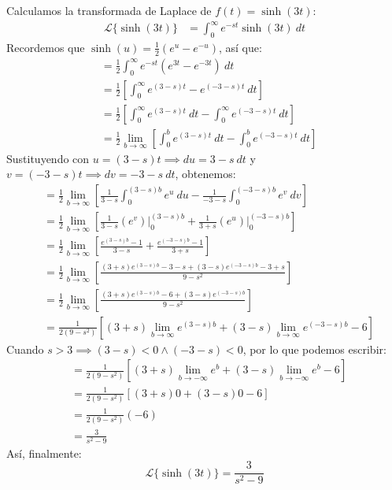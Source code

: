 \documentclass[12pt, a4paper]{article}
\begin{document}
Calculamos la transformada de Laplace de \(f(t) = \sinh(3t)\):
\begin{align*}
	\mathcal{L}\{\sinh(3t)\} &= \int_{0}^{\infty} e^{-st} \sinh(3t) \ dt
\end{align*}
Recordemos que \(\sinh(u) = \frac{1}{2} (e^{u} - e^{-u})\), así que:
\begin{align*}
	&= \frac{1}{2} \int_{0}^{\infty} e^{-st} (e^{3t} - e^{-3t}) \ dt \\
	&= \frac{1}{2} \left[ \int_{0}^{\infty} e^{(3-s)t} - e^{(-3-s)t} \ dt \right] \\
	&= \frac{1}{2} \left[ \int_{0}^{\infty} e^{(3-s)t} \ dt - \int_{0}^{\infty} e^{(-3-s)t} \ dt \right] \\
	&= \frac{1}{2} \lim_{b \to \infty} \left[ \int_{0}^{b} e^{(3-s)t} \ dt - \int_{0}^{b} e^{(-3-s)t} \ dt \right]
\end{align*}
Sustituyendo con \(u = (3-s)t \implies du = 3-s\ dt\) y \(v = (-3-s)t \implies dv = -3-s\ dt\), obtenemos:
\begin{align*}
	&= \frac{1}{2} \lim_{b \to \infty} \left[ \frac{1}{3-s} \int_{0}^{(3-s)b} e^{u} \ du - \frac{1}{-3-s} \int_{0}^{(-3-s)b} e^{v} \ dv \right] \\
	&= \frac{1}{2} \lim_{b \to \infty} \left[ \frac{1}{3-s} \left. \left( e^{v} \right) \right|_{0}^{(3-s)b} + \frac{1}{3+s} \left. \left( e^{u} \right) \right|_{0}^{(-3-s)b} \right] \\
	&= \frac{1}{2} \lim_{b \to \infty} \left[ \frac{e^{(3-s)b} - 1}{3-s} + \frac{e^{(-3-s)b} - 1}{3+s} \right] \\
	&= \frac{1}{2} \lim_{b \to \infty} \left[ \frac{(3+s) e^{(3-s)b} - 3 - s + (3-s)e^{(-3-s)b} - 3 + s}{9-s ^{2}} \right] \\
	&= \frac{1}{2} \lim_{b \to \infty} \left[ \frac{(3+s) e^{(3-s)b} - 6 + (3-s)e^{(-3-s)b}}{9-s ^{2}} \right] \\
	&= \frac{1}{2(9-s ^{2})} \left[ (3+s) \lim_{b \to \infty} e^{(3-s)b} + (3-s) \lim_{b \to \infty} e^{(-3-s)b} - 6 \right]
\end{align*}
Cuando \(s > 3 \implies (3-s) < 0 \land (-3-s) < 0\), por lo que podemos escribir:
\begin{align*}
	&= \frac{1}{2(9-s ^{2})} \left[ (3+s) \lim_{b \to -\infty} e^{b} + (3-s) \lim_{b \to -\infty} e^{b} - 6 \right] \\
	&= \frac{1}{2(9-s ^{2})} \left[ (3+s) 0 + (3-s) 0 - 6 \right] \\
	&= \frac{1}{2(9-s ^{2})} (-6) \\
	&= \frac{3}{s ^{2} - 9}
\end{align*}
Así, finalmente:
\[
	\mathcal{L}\{\sinh(3t)\} = \frac{3}{s ^{2} - 9}
\]
\end{document}
